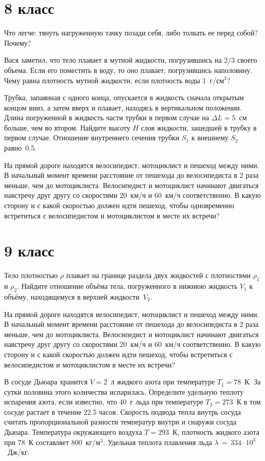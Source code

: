\section{8 класс}

\AddProb Что легче: тянуть нагруженную тачку позади себя, либо толкать ее перед собой? Почему?

\AddProb Вася заметил, что тело плавает в мутной жидкости, погрузившись на 2/3 своего объема. 
Если его поместить в воду, то оно плавает, погрузившись наполовину. Чему равна плотность мутной жидкости, если плотность воды 1~г/см$^3$?

\AddProb Трубка, запаянная с одного конца, опускается в жидкость сначала открытым концом вниз, а затем вверх и плавает, находясь в вертикальном положении. 
Длина погруженной в жидкость части трубки в первом случае на $\Delta L = 5$~см больше, чем во втором. 
Найдите высоту $H$ слоя жидкости, зашедшей в трубку в первом случае. Отношение внутреннего сечения трубки $S_1$ к внешнему $S_2$ равно~0.5.

\AddProb На прямой дороге находятся велосипедист, мотоциклист и пешеход между ними. 
В начальный момент времени расстояние от пешехода до велосипедиста в 2 раза меньше, чем до мотоциклиста. 
Велосипедист и мотоциклист начинают двигаться навстречу друг другу со скоростями 20~км/ч и 60~км/ч соответственно. 
В какую сторону и с какой скоростью должен идти пешеход, чтобы одновременно встретиться с велосипедистом и мотоциклистом в месте их встречи?



\section{9 класс}

\AddProb Тело плотностью $\rho$ плавает на границе раздела двух жидкостей с плотностями $\rho_1$ и $\rho_2$. 
Найдите отношение объёма тела, погруженного в нижнюю жидкость $V_1$ к объёму, находящемуся в верхней жидкости~$V_2$.

\AddProb На прямой дороге находятся велосипедист, мотоциклист и пешеход между ними. 
В начальный момент времени расстояние от пешехода до велосипедиста в 2 раза меньше, чем до мотоциклиста. 
Велосипедист и мотоциклист начинают двигаться навстречу друг другу со скоростями 20~км/ч и 60~км/ч соответственно. 
В какую сторону и с какой скоростью должен идти  пешеход, чтобы встретиться с велосипедистом и мотоциклистом в месте их встречи?

\AddProb В сосуде Дьюара хранится $V = 2$~л жидкого азота при температуре $T_1 = 78$~К. За сутки половина этого количества испарилась. 
Определите удельную теплоту испарения азота, если известно, что 40~г льда при температуре $T_2  = 273$~К в том сосуде растает в течение 22.5 часов. 
Скорость подвода тепла внутрь сосуда считать пропорциональной разности температур внутри и снаружи сосуда Дьюара. 
Температура окружающего воздуха $T  = 293$~К, плотность жидкого азота при 78~К составляет 800~кг/м$^3$. 
Удельная теплота плавления льда $\lambda\,=\,334\cdot 10^3$~Дж/кг.


